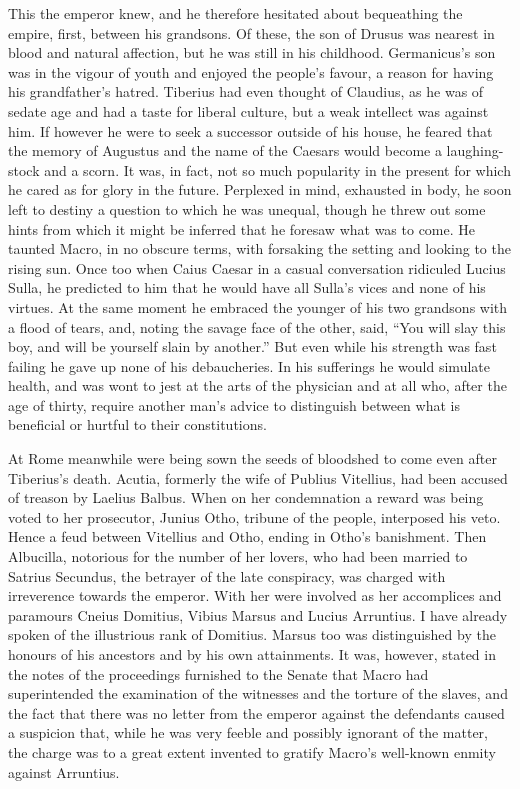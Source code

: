 This the emperor knew, and he therefore hesitated about bequeathing the empire, first, between his grandsons. Of these, the son of Drusus was nearest in blood and natural affection, but he was still in his childhood. Germanicus's son was in the vigour of youth and enjoyed the people's favour, a reason for having his grandfather's hatred. Tiberius had even thought of Claudius, as he was of sedate age and had a taste for liberal culture, but a weak intellect was against him. If however he were to seek a successor outside of his house, he feared that the memory of Augustus and the name of the Caesars would become a laughing-stock and a scorn. It was, in fact, not so much popularity in the present for which he cared as for glory in the future. Perplexed in mind, exhausted in body, he soon left to destiny a question to which he was unequal, though he threw out some hints from which it might be inferred that he foresaw what was to come. He taunted Macro, in no obscure terms, with forsaking the setting and looking to the rising sun. Once too when Caius Caesar in a casual conversation ridiculed Lucius Sulla, he predicted to him that he would have all Sulla's vices and none of his virtues. At the same moment he embraced the younger of his two grandsons with a flood of tears, and, noting the savage face of the other, said, ``You will slay this boy, and will be yourself slain by another.'' But even while his strength was fast failing he gave up none of his debaucheries. In his sufferings he would simulate health, and was wont to jest at the arts of the physician and at all who, after the age of thirty, require another man's advice to distinguish between what is beneficial or hurtful to their constitutions.


At Rome meanwhile were being sown the seeds of bloodshed to come even after Tiberius's death. Acutia, formerly the wife of Publius Vitellius, had been accused of treason by Laelius Balbus. When on her condemnation a reward was being voted to her prosecutor, Junius Otho, tribune of the people, interposed his veto. Hence a feud between Vitellius and Otho, ending in Otho's banishment. Then Albucilla, notorious for the number of her lovers, who had been married to Satrius Secundus, the betrayer of the late conspiracy, was charged with irreverence towards the emperor. With her were involved as her accomplices and paramours Cneius Domitius, Vibius Marsus and Lucius Arruntius. I have already spoken of the illustrious rank of Domitius. Marsus too was distinguished by the honours of his ancestors and by his own attainments. It was, however, stated in the notes of the proceedings furnished to the Senate that Macro had superintended the examination of the witnesses and the torture of the slaves, and the fact that there was no letter from the emperor against the defendants caused a suspicion that, while he was very feeble and possibly ignorant of the matter, the charge was to a great extent invented to gratify Macro's well-known enmity against Arruntius.

